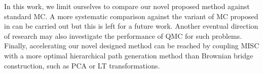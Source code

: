 In this work, we limit ourselves to compare our novel proposed method against standard MC. A more systematic comparison against the variant of MC proposed in \cite{mccrickerd2017turbocharging}  can be carried out but this is left for a future work. Another  eventual direction of research may also investigate the performance of QMC for such problems. Finally, accelerating  our novel designed method can be reached  by coupling MISC with a more optimal hierarchical path generation method than Brownian bridge construction, such as PCA or LT transformations.